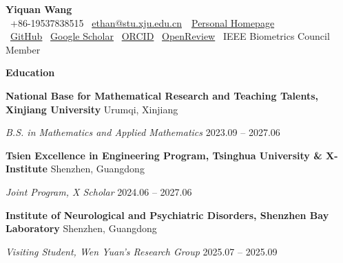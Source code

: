 \documentclass[11pt]{article}
\begin{document}
	\begin{center}
		\textbf{\Large Yiquan Wang}\\
		\textbullet \ +86-19537838515 \textbullet \ \href{mailto:ethan@stu.xju.edu.cn}{ethan@stu.xju.edu.cn}\ \textbullet \ \href{https://wyqmath.cn/}{Personal Homepage} \\
		\textbullet \ \href{https://github.com/wyqmath}{GitHub} \textbullet \ \href{https://scholar.google.com/citations?user=ULP3e1cAAAAJ}{Google Scholar} \textbullet \ \href{https://orcid.org/0000-0003-1417-5752}{ORCID} \textbullet \ \href{https://openreview.net/profile?id=~Yiquan_Wang3}{OpenReview} \textbullet \ IEEE Biometrics Council Member \\
		\hrulefill
	\end{center}
	
	\vspace{2pt}
	
	\begin{center}
		\textbf{\large Education}
	\end{center}
	\textbf{National Base for Mathematical Research and Teaching Talents, Xinjiang University} \hfill Urumqi, Xinjiang
	
	\textit{B.S. in Mathematics and Applied Mathematics} \hfill 2023.09 – 2027.06
	
	\vspace{10pt}
	
	\textbf{Tsien Excellence in Engineering Program, Tsinghua University \& X-Institute} \hfill Shenzhen, Guangdong
	
	\textit{Joint Program, X Scholar} \hfill 2024.06 – 2027.06
	
	\vspace{10pt}
	
	\textbf{Institute of Neurological and Psychiatric Disorders, Shenzhen Bay Laboratory} \hfill Shenzhen, Guangdong
	
	\textit{Visiting Student, Wen Yuan's Research Group} \hfill 2025.07 – 2025.09
	
	\vspace{12pt}
	
\end{document}
